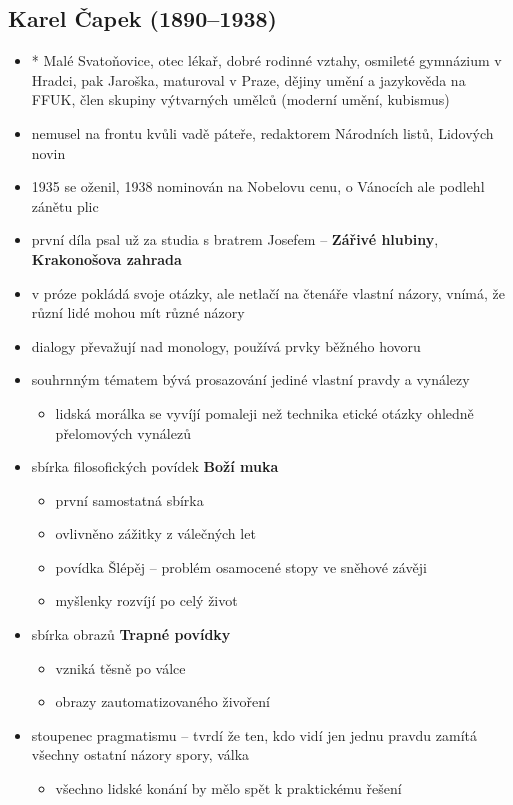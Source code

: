 \subsection{Karel Čapek (1890--1938)}
\begin{itemize}
\item * Malé Svatoňovice, otec lékař, dobré rodinné vztahy, osmileté gymnázium v Hradci, pak Jaroška, maturoval v Praze, dějiny umění a jazykověda na FFUK, člen skupiny výtvarných umělců (moderní umění, kubismus)
\item nemusel na frontu kvůli vadě páteře, redaktorem Národních listů, Lidových novin
\item 1935 se oženil, 1938 nominován na Nobelovu cenu, o Vánocích ale podlehl zánětu plic
\item první díla psal už za studia s bratrem Josefem -- \textbf{Zářivé hlubiny}, \textbf{Krakonošova zahrada}
\item v próze pokládá svoje otázky, ale netlačí na čtenáře vlastní názory, vnímá, že různí lidé mohou mít různé názory
\item dialogy převažují nad monology, používá prvky běžného hovoru
\item souhrnným tématem bývá prosazování jediné vlastní pravdy a vynálezy	
	\begin{itemize}
	\item lidská morálka se vyvíjí pomaleji než technika \ra etické otázky ohledně přelomových vynálezů
	\end{itemize}
\item sbírka filosofických povídek \textbf{Boží muka} 
	\begin{itemize}
	\item první samostatná sbírka
	\item ovlivněno zážitky z válečných let
	\item povídka Šlépěj -- problém osamocené stopy ve sněhové závěji
	\item myšlenky rozvíjí po celý život
	\end{itemize}

\item sbírka obrazů \textbf{Trapné povídky}
	\begin{itemize}
	\item vzniká těsně po válce
	\item obrazy zautomatizovaného živoření
	\end{itemize}


\item stoupenec pragmatismu -- tvrdí že ten, kdo vidí jen jednu pravdu zamítá všechny ostatní názory \ra spory, válka
	\begin{itemize}
	\item všechno lidské konání by mělo spět k praktickému řešení
	\end{itemize}


\end{itemize}
